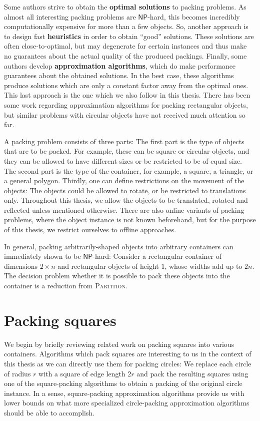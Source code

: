 \documentclass[a4paper,style=print,bibliography=totoc,nexus,lnum,extramargin]{tubsbook}
\begin{document}
Some authors strive to obtain the \textbf{optimal solutions} to packing problems. As almost all interesting packing problems are $\mathsf{NP}$-hard, this becomes incredibly computationally expensive for more than a few objects.
So, another approach is to design fast \textbf{heuristics} in order to obtain “good” solutions. These solutions are often close-to-optimal, but may degenerate for certain instances and thus make no guarantees about the actual quality of the produced packings.
Finally, some authors develop \textbf{approximation algorithms}, which do make performance guarantees about the obtained solutions. In the best case, these algorithms produce solutions which are only a constant factor away from the optimal ones. This last approach is the one which we also follow in this thesis. There has been some work regarding approximation algorithms for packing rectangular objects, but similar problems with circular objects have not received much attention so far.

A packing problem consists of three parts: The first part is the type of objects that are to be packed. For example, these can be square or circular objects, and they can be allowed to have different sizes or be restricted to be of equal size. The second part is the type of the container, for example, a square, a triangle, or a general polygon. Thirdly, one can define restrictions on the movement of the objects: The objects could be allowed to rotate, or be restricted to translations only. Throughout this thesis, we allow the objects to be translated, rotated and reflected unless mentioned otherwise. There are also online variants of packing problems, where the object instance is not known beforehand, but for the purpose of this thesis, we restrict ourselves to offline approaches.

In general, packing arbitrarily-shaped objects into arbitrary containers can immediately shown to be $\mathsf{NP}$-hard: Consider a rectangular container of dimensions $2 \times n$ and rectangular objects of height $1$, whose widths add up to $2n$. The decision problem whether it is possible to pack these objects into the container is a reduction from \textsc{Partition}.

\section{Packing squares}\label{sec:related-squares}

We begin by briefly reviewing related work on packing squares into various containers.
Algorithms which pack squares are interesting to us in the context of this thesis as we can directly use them for packing circles: We replace each circle of radius $r$ with a square of edge length $2r$ and pack the resulting squares using one of the square-packing algorithms to obtain a packing of the original circle instance. In a sense, square-packing approximation algorithms provide us with lower bounds on what more specialized circle-packing approximation algorithms should be able to accomplish.
\end{document}
